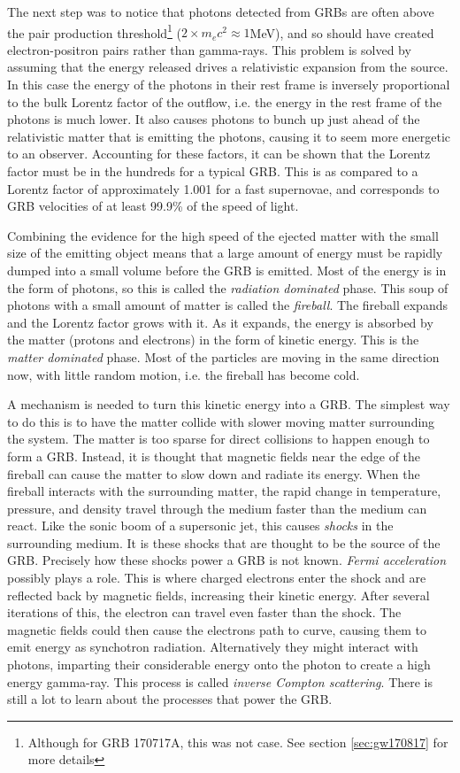 \documentclass[11pt]{cuthesis}
\begin{document}
The next step was to notice that photons detected from GRBs are often above the pair production threshold\footnote{Although for GRB 170717A, this was not case. See section \ref{sec:gw170817} for more details} ($2\times m_e c^2\approx 1$MeV), and so should have created electron-positron pairs rather than gamma-rays. This problem is solved by assuming that the energy released drives a relativistic expansion from the source. In this case the energy of the photons in their rest frame is inversely proportional to the bulk Lorentz factor of the outflow, i.e. the energy in the rest frame of the photons is much lower. It also causes photons to bunch up just ahead of the relativistic matter that is emitting the photons, causing it to seem more energetic to an observer. Accounting for these factors, it can be shown that the Lorentz factor must be in the hundreds for a typical GRB. This is as compared to a Lorentz factor of approximately 1.001 for a fast supernovae, and corresponds to GRB velocities of at least 99.9\% of the speed of light. 

Combining the evidence for the high speed of the ejected matter with the small size of the emitting object means that a large amount of energy must be rapidly dumped into a small volume before the GRB is emitted. Most of the energy is in the form of photons, so this is called the \textit{radiation dominated} phase. This soup of photons with a small amount of matter is called the \textit{fireball}. The fireball expands and the Lorentz factor grows with it. As it expands, the energy is absorbed by the matter (protons and electrons) in the form of kinetic energy. This is the \textit{matter dominated} phase. Most of the particles are moving in the same direction now, with little random motion, i.e. the fireball has become cold. 

A mechanism is needed to turn this kinetic energy into a GRB. The simplest way to do this is to have the matter collide with slower moving matter surrounding the system. The matter is too sparse for direct collisions to happen enough to form a GRB. Instead, it is thought that magnetic fields near the edge of the fireball can cause the matter to slow down and radiate its energy. When the fireball interacts with the surrounding matter, the rapid change in temperature, pressure, and density travel through the medium faster than the medium can react. Like the sonic boom of a supersonic jet, this causes \textit{shocks} in the surrounding medium. It is these shocks that are thought to be the source of the GRB. Precisely how these shocks power a GRB is not known. \textit{Fermi acceleration} possibly plays a role. This is where charged electrons enter the shock and are reflected back by magnetic fields, increasing their kinetic energy. After several iterations of this, the electron can travel even faster than the shock. The magnetic fields could then cause the electrons path to curve, causing them to emit energy as synchotron radiation. Alternatively they might interact with photons, imparting their considerable energy onto the photon to create a high energy gamma-ray. This process is called \textit{inverse Compton scattering}. There is still a lot to learn about the processes that power the GRB.
\end{document}
